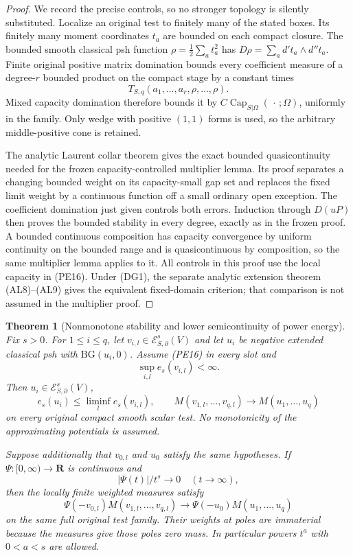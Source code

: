 \documentclass[11pt,a4paper]{article}
\numberwithin{equation}{section}
\newtheorem{theorem}{Theorem}[section]
\theoremstyle{definition}
\theoremstyle{remark}
\begin{document}
\begin{proof}
We record the precise controls, so no stronger topology is
silently substituted. Localize an original test to finitely many
of the stated boxes. Its finitely many moment coordinates $t_a$
are bounded on each compact closure. The bounded smooth classical
psh function $\rho=\frac12\sum_a t_a^2$ has
$D\rho=\sum_a d't_a\wedge d''t_a$. Finite original positive
matrix domination bounds every coefficient measure of a degree-$r$
bounded product on the compact stage by a constant times
\[
          T_{S,q}(a_1,\ldots,a_r,\rho,\ldots,\rho).
\]
Mixed capacity domination therefore bounds it by
$C\operatorname{Cap}_{S|\Omega}(\,\cdot\,;\Omega)$, uniformly
in the family. Only wedge with positive $(1,1)$ forms is used,
so the arbitrary middle-positive cone is retained.

The analytic Laurent collar theorem gives the exact bounded
quasicontinuity needed for the frozen capacity-controlled
multiplier lemma. Its proof separates a changing bounded weight
on its capacity-small gap set and replaces the fixed limit weight
by a continuous function off a small ordinary open exception.
The coefficient domination just given controls both errors.
Induction through $D(uP)$ then proves the bounded stability in
every degree, exactly as in the frozen proof. A bounded continuous
composition has capacity convergence by uniform continuity on
the bounded range and is quasicontinuous by composition, so the
same multiplier lemma applies to it. All controls in this proof use
the local capacity in (PE16). Under (DG1), the separate analytic
extension theorem (AL8)--(AL9) gives the equivalent fixed-domain
criterion; that comparison is not assumed in the multiplier proof.
\end{proof}

\begin{theorem}[Nonmonotone stability and lower semicontinuity of power energy]
\label{thm:r11-power-capacity-stability}
Fix $s>0$. For $1\leq i\leq q$, let
$v_{i,l}\in\mathcal E^s_{S,\partial}(V)$ and let $u_i$ be
negative extended classical psh with $\mathrm{BG}(u_i,0)$.
Assume (PE16) in every slot and
\[
                         \sup_{i,l}e_s(v_{i,l})<\infty.
 \tag{PE17}
\]
Then $u_i\in\mathcal E^s_{S,\partial}(V)$,
\[
 e_s(u_i)\leq\liminf_l e_s(v_{i,l}),\qquad
 M(v_{1,l},\ldots,v_{q,l})\longrightarrow M(u_1,\ldots,u_q)
 \tag{PE18}
\]
on every original compact smooth scalar test. No monotonicity of
the approximating potentials is assumed.

Suppose additionally that $v_{0,l}$ and $u_0$ satisfy the same
hypotheses. If $\Psi:[0,\infty)\to\mathbf R$ is continuous and
\[
                         |\Psi(t)|/t^s\longrightarrow0
                                      \quad(t\to\infty),
 \tag{PE19}
\]
then the locally finite weighted measures satisfy
\[
 \Psi(-v_{0,l})M(v_{1,l},\ldots,v_{q,l})
        \longrightarrow\Psi(-u_0)M(u_1,\ldots,u_q)
 \tag{PE20}
\]
on the same full original test family. Their weights at poles
are immaterial because the measures give those poles zero mass.
In particular powers $t^a$ with $0<a<s$ are allowed.
\end{theorem}
\end{document}
